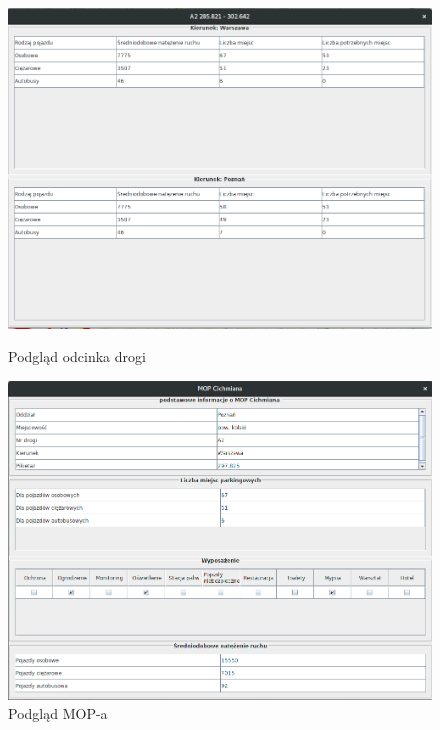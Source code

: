 \begin{figure}
  \centering
  \begin{minipage}{.5\textwidth}
      \centering
      \includegraphics[width=.9\linewidth]{images/mopnik/podglad_drogi.png}
      \caption{Podgląd odcinka drogi}
  \end{minipage}%
  \begin{minipage}{.5\textwidth}
    \centering
    \includegraphics[width=.9\linewidth]{images/mopnik/podglad_mopa.png}
    \caption{Podgląd MOP-a}
  \end{minipage}
\end{figure}
